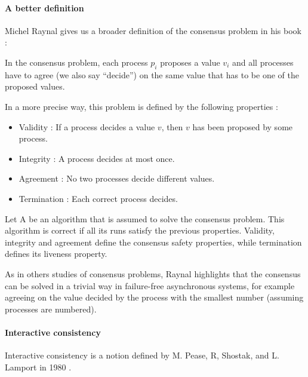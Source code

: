 \documentclass[11pt, twocolumn]{article}
\begin{document}
\paragraph{A better definition}

Michel Raynal gives us a broader definition of the consensus problem in his book \cite{raynal} :
\begin{displayquote}
    In the consensus problem, each process $p_i$ proposes a value $v_i$ and all processes have to agree (we also say “decide”) on the same value that has to be one of the proposed values.

    In a more precise way, this problem is defined by the following properties :
    \begin{itemize}
        \item Validity : If a process decides a value $v$, then $v$ has been proposed by some process.
        \item Integrity : A process decides at most once.
        \item Agreement : No two processes decide different values.
        \item Termination : Each correct process decides.
    \end{itemize}
    Let A be an algorithm that is assumed to solve the consensus problem. This algorithm is correct if all its runs satisfy the previous properties. Validity, integrity and agreement define the consensus safety properties, while termination defines its liveness property.
\end{displayquote}

As in others studies of consensus problems, Raynal highlights that the consensus can be solved in a trivial way in failure-free asynchronous systems, for example agreeing on the value decided by the process with the smallest number (assuming processes are numbered).


\paragraph{Interactive consistency}

Interactive consistency is a notion defined by M. Pease, R, Shostak, and L. Lamport in 1980 \cite{reachingagreement}.
\end{document}
